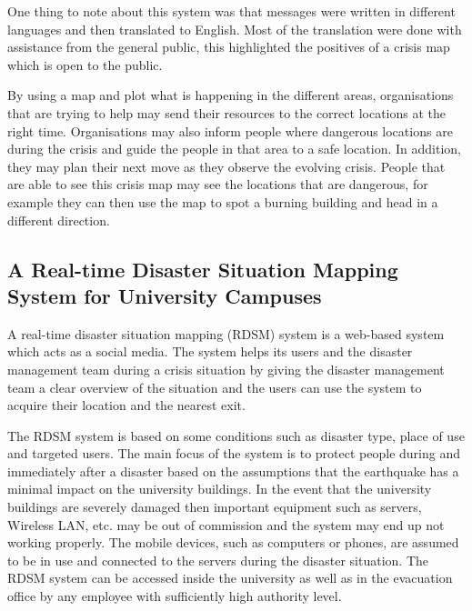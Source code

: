 One thing to note about this system was that messages were written in different languages and then translated to English. Most of the translation were done with assistance from the general public, this highlighted the positives of a crisis map which is open to the public.

By using a map and plot what is happening in the different areas, organisations that are trying to help may send their resources to the correct locations at the right time. Organisations may also inform people where dangerous locations are during the crisis and guide the people in that area to a safe location. In addition, they may plan their next move as they observe the evolving crisis. People that are able to see this crisis map may see the locations that are dangerous, for example they can then use the map to spot a burning building and head in a different direction. 

\subsection{A Real-time Disaster Situation Mapping System for University Campuses}

A real-time disaster situation mapping (RDSM) system is a web-based system which acts as a social media. The system helps its users and the disaster management team during a crisis situation by giving the disaster management team a clear overview of the situation and the users can use the system to acquire their location and the nearest exit.

The RDSM system is based on some conditions such as disaster type, place of use and targeted users. The main focus of the system is to protect people during and immediately after a disaster based on the assumptions that the earthquake has a minimal impact on the university buildings. In the event that the university buildings are severely damaged then important equipment such as servers, Wireless LAN, etc. may be out of commission and the system may end up not working properly. The mobile devices, such as computers or phones, are assumed to be in use and connected to the servers during the disaster situation. The RDSM system can be accessed inside the university as well as in the evacuation office by any employee with sufficiently high authority level.

